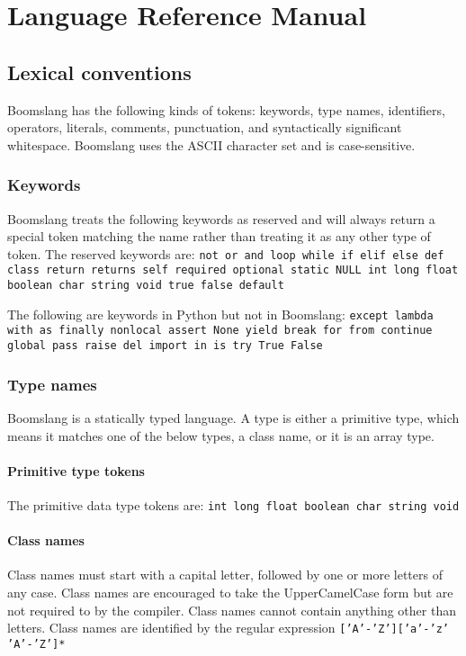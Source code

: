 \documentclass{article}
\begin{document}
\section{Language Reference Manual}
\subsection{Lexical conventions}
Boomslang has the following kinds of tokens: keywords, type names, identifiers, operators, literals, comments, punctuation, and syntactically significant whitespace. Boomslang uses the ASCII character set and is case-sensitive.

\subsubsection{Keywords}
Boomslang treats the following keywords as reserved and will always return a special token matching the name rather than treating it as any other type of token. The reserved keywords are:
\texttt{not or and loop while if elif else def class return returns self required optional static NULL int long float boolean char string void true false default}

The following are keywords in Python but not in Boomslang: \texttt{except lambda with as finally nonlocal assert None yield break for from continue global pass raise del import in is try True False}

\subsubsection{Type names}
\label{sec:typenames}
Boomslang is a statically typed language. A type is either a primitive type, which means it matches one of the below types, a class name, or it is an array type.

\paragraph{Primitive type tokens}
\label{sec:primitivetypetokens}
The primitive data type tokens are: \texttt{int long float boolean char string void}

\paragraph{Class names}
Class names must start with a capital letter, followed by one or more letters of any case. Class names are encouraged to take the UpperCamelCase form but are not required to by the compiler. Class names cannot contain anything other than letters. Class names are identified by the regular expression \texttt{['A'-'Z']['a'-'z' 'A'-'Z']*}
\end{document}
